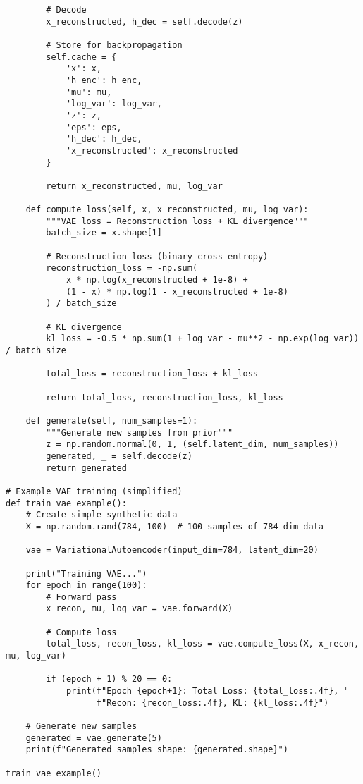 ﻿\documentclass[12pt,a4paper]{article}
\begin{document}
\begin{lstlisting}
        # Decode
        x_reconstructed, h_dec = self.decode(z)
        
        # Store for backpropagation
        self.cache = {
            'x': x,
            'h_enc': h_enc,
            'mu': mu,
            'log_var': log_var,
            'z': z,
            'eps': eps,
            'h_dec': h_dec,
            'x_reconstructed': x_reconstructed
        }
        
        return x_reconstructed, mu, log_var
    
    def compute_loss(self, x, x_reconstructed, mu, log_var):
        """VAE loss = Reconstruction loss + KL divergence"""
        batch_size = x.shape[1]
        
        # Reconstruction loss (binary cross-entropy)
        reconstruction_loss = -np.sum(
            x * np.log(x_reconstructed + 1e-8) + 
            (1 - x) * np.log(1 - x_reconstructed + 1e-8)
        ) / batch_size
        
        # KL divergence
        kl_loss = -0.5 * np.sum(1 + log_var - mu**2 - np.exp(log_var)) / batch_size
        
        total_loss = reconstruction_loss + kl_loss
        
        return total_loss, reconstruction_loss, kl_loss
    
    def generate(self, num_samples=1):
        """Generate new samples from prior"""
        z = np.random.normal(0, 1, (self.latent_dim, num_samples))
        generated, _ = self.decode(z)
        return generated

# Example VAE training (simplified)
def train_vae_example():
    # Create simple synthetic data
    X = np.random.rand(784, 100)  # 100 samples of 784-dim data
    
    vae = VariationalAutoencoder(input_dim=784, latent_dim=20)
    
    print("Training VAE...")
    for epoch in range(100):
        # Forward pass
        x_recon, mu, log_var = vae.forward(X)
        
        # Compute loss
        total_loss, recon_loss, kl_loss = vae.compute_loss(X, x_recon, mu, log_var)
        
        if (epoch + 1) % 20 == 0:
            print(f"Epoch {epoch+1}: Total Loss: {total_loss:.4f}, "
                  f"Recon: {recon_loss:.4f}, KL: {kl_loss:.4f}")
    
    # Generate new samples
    generated = vae.generate(5)
    print(f"Generated samples shape: {generated.shape}")

train_vae_example()
\end{lstlisting}
\end{document}
